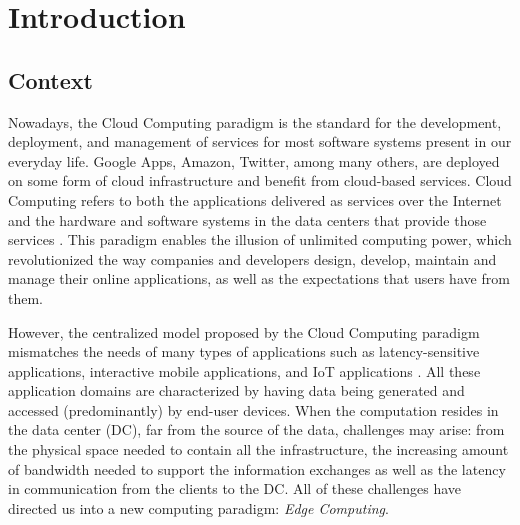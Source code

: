 


\chapter{Introduction}
\label{cha:introduction}



\section{Context} \label{sec:context}

Nowadays, the Cloud Computing paradigm is the standard for the development, deployment, and management of services for most software systems present in our everyday life. Google Apps, Amazon, Twitter, among many others, are deployed on some form of cloud infrastructure and benefit from cloud-based services. Cloud Computing refers to both the applications delivered as services over the Internet and the hardware and software systems in the data centers that provide those services \cite{10.1145/1721654.1721672}. This paradigm enables the illusion of unlimited computing power, which revolutionized the way companies and developers design, develop, maintain and manage their online applications, as well as the expectations that users have from them.

However, the centralized model proposed by the Cloud Computing paradigm mismatches the needs of many types of applications such as latency-sensitive applications, interactive mobile applications, and IoT applications \cite{10.1145/3154815}. All these application domains are characterized by having data being generated and accessed (predominantly) by end-user devices. When the computation resides in the data center (DC), far from the source of the data, challenges may arise: from the physical space needed to contain all the infrastructure, the increasing amount of bandwidth needed to support the information exchanges as well as the latency in communication from the clients to the DC. All of these challenges have directed us into a new computing paradigm: \textit{Edge Computing}.

